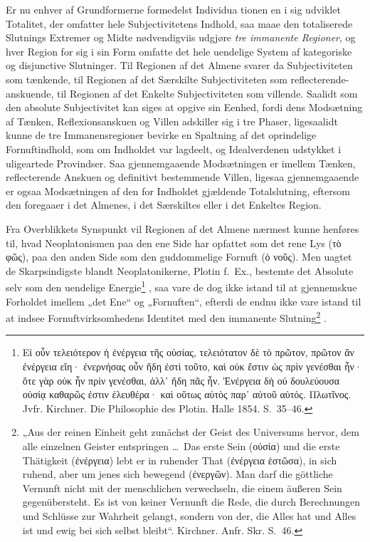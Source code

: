 \documentclass[12pt]{book}
\newcommand{\opage}[1]{\marginnote{\footnotesize\textit{[#1]}}}
\begin{document}
Er nu enhver af Grundformerne formedelst Individua%
\opage{358}tionen en i sig udviklet Totalitet, der omfatter hele Subjectivitetens Indhold, saa maae den totaliserede Slutnings Extremer og Midte nødvendigviis udgjøre \emph{tre immanente Regioner}, og hver Region for sig i sin Form omfatte det hele uendelige System af kategoriske og disjunctive Slutninger. Til Regionen af det Almene svarer da Subjectiviteten som tænkende, til Regionen af det Særskilte Subjectiviteten som reflecterende-anskuende, til Regionen af det Enkelte Subjectiviteten som villende. Saalidt som den absolute Subjectivitet kan siges at opgive sin Eenhed, fordi dens Modsætning af Tænken, Reflexionsanskuen og Villen adskiller sig i tre Phaser, ligesaalidt kunne de tre Immanensregioner bevirke en Spaltning af det oprindelige Fornuftindhold, som om Indholdet var lagdeelt, og Idealverdenen udstykket i uligeartede Provindser. Saa gjennemgaaende Modsætningen er imellem Tænken, reflecterende Anskuen og definitivt bestemmende Villen, ligesaa gjennemgaaende er ogsaa Modsætningen af den for Indholdet gjældende Totalslutning, eftersom den foregaaer i det Almenes, i det Særskiltes eller i det Enkeltes Region.

Fra Overblikkets Synspunkt vil Regionen af det Almene nærmest kunne henføres til, hvad Neoplatonismen paa den ene Side har opfattet som det rene Lys (τὸ φῶς), paa den anden Side som den guddommelige Fornuft (ὁ νοῦς). Men uagtet de Skarpsindigste blandt Neoplatonikerne, Plotin f.\ Ex., bestemte det Absolute selv som den uendelige Energie\footnote{Εἰ οὖν τελειότερον ἡ ἐνέργεια τῆς οὐσίας, τελειότατον δὲ τὸ πρῶτον, πρῶτον ἂν ἐνέργεια εἴη· ἐνερνήσας οὖν ἤδη ἐστὶ τοῦτο, καὶ %
οὐκ ἔστιν ὡς πρὶν γενέσθαι ἦν· ὅτε γὰρ οὐκ ἦν πρὶν γενέσθαι, ἀλλ᾽ ἤδη πᾶς ἦν. Ἐνέργεια δὴ οὐ δουλεύουσα οὐσίᾳ καθαρῶς ἐστιν ἐλευθέρα· καὶ οὕτως αὐτὸς παρ᾽ αὐτοῦ αὐτός. Πλωτῖνος. Jvfr. Kirchner. Die Philosophie des Plotin. Halle 1854. S.~35--46.}%
, saa vare de dog ikke istand til at gjennemskue Forholdet imellem „det
\opage{359}Ene“ og „Fornuften“, efterdi de endnu ikke vare istand til at indsee Fornuftvirksomhedens Identitet med den immanente Slutning\footnote{„Aus der reinen Einheit geht zunächst der Geist des Universums hervor, dem alle einzelnen Geister entspringen \dots\ Das erste Sein (οὐσία) und die erste Thätigkeit (ἐνέργεια) lebt er in ruhender That (ἐνέργεια ἑστῶσα), in sich ruhend, aber um jenes sich bewegend (ἐνεργῶν). Man darf die göttliche Vernunft nicht mit der menschlichen verwechseln, die einem äußeren Sein gegenübersteht. Es ist von keiner Vernunft die Rede, die durch Berechnungen und Schlüsse zur Wahrheit gelangt, sondern von der, die Alles hat und Alles ist und ewig bei sich selbst bleibt“. Kirchner. Anfr. Skr. S.~46.}%
.
\end{document}
